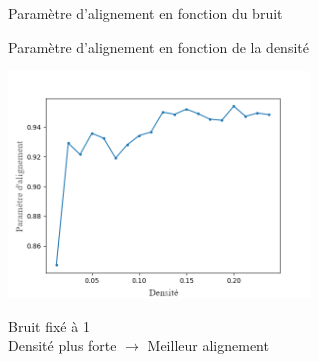 \documentclass[aspectratio=43, a4paper, 12pt]{beamer}
\begin{document}
\begin{frame}{Paramètre d'alignement en fonction du bruit}

\end{frame}

\begin{frame}{Paramètre d'alignement en fonction de la densité}
   \begin{center}\includegraphics[width=8cm]{images/densite_1[noise=1]2.png}\end{center}
   \begin{center} Bruit fixé à 1 \\ Densité plus forte $\rightarrow$ Meilleur alignement \end{center}
\end{frame}
\end{document}
